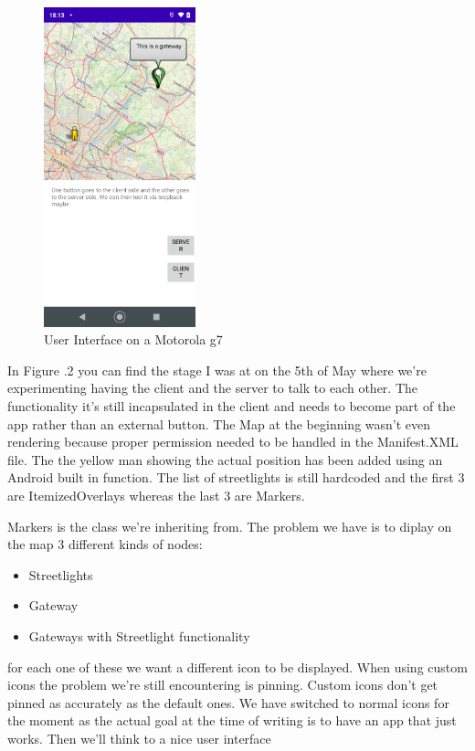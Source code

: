 \documentclass[a4paper,12pt]{article}
\begin{document}
\begin{figure}
\includegraphics[width=4.4cm]{./current_status_g7.PNG}
\caption{User Interface on a Motorola g7}\label{wrap-fig:2}
\end{figure}

In Figure .2 you can find the stage I was at on the 5th of May where we're experimenting having the client and the server to talk to each other. The functionality it's still incapsulated in the client and needs to become part of the app rather than an external button. The Map at the beginning wasn't even rendering because proper permission needed to be handled in the Manifest.XML file. The the yellow man showing the actual position has been added using an Android built in function. The list of streetlights is still hardcoded and the first 3 are ItemizedOverlays whereas the last 3 are Markers.

Markers is the class we're inheriting from. The problem we have is to diplay on the map 3 different kinds of nodes:

\begin{itemize}
\item Streetlights
\item Gateway
\item {Gateways with Streetlight functionality}
\end{itemize}

for each one of these we want a different icon to be displayed. When using custom icons the problem we're still encountering is pinning. Custom icons don't get pinned as accurately as the default ones. We have switched to normal icons for the moment as the actual goal at the time of writing is to have an app that just works. Then we'll think to a nice user interface
\end{document}
